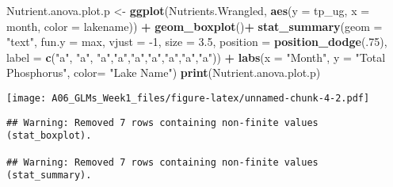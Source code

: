 \documentclass[]{article}
\newenvironment{Shaded}{\begin{snugshade}}{\end{snugshade}}
\newcommand{\CommentTok}[1]{\textcolor[rgb]{0.56,0.35,0.01}{\textit{#1}}}
\newcommand{\DataTypeTok}[1]{\textcolor[rgb]{0.13,0.29,0.53}{#1}}
\newcommand{\DecValTok}[1]{\textcolor[rgb]{0.00,0.00,0.81}{#1}}
\newcommand{\FloatTok}[1]{\textcolor[rgb]{0.00,0.00,0.81}{#1}}
\newcommand{\KeywordTok}[1]{\textcolor[rgb]{0.13,0.29,0.53}{\textbf{#1}}}
\newcommand{\NormalTok}[1]{#1}
\newcommand{\OperatorTok}[1]{\textcolor[rgb]{0.81,0.36,0.00}{\textbf{#1}}}
\newcommand{\StringTok}[1]{\textcolor[rgb]{0.31,0.60,0.02}{#1}}
\begin{document}
\begin{Shaded}
\begin{Highlighting}[]
\NormalTok{Nutrient.anova.plot.p <-}\StringTok{ }\KeywordTok{ggplot}\NormalTok{(Nutrients.Wrangled, }\KeywordTok{aes}\NormalTok{(}\DataTypeTok{y =}\NormalTok{ tp_ug, }\DataTypeTok{x =}\NormalTok{ month, }\DataTypeTok{color =}\NormalTok{ lakename)) }\OperatorTok{+}
\StringTok{  }\KeywordTok{geom_boxplot}\NormalTok{()}\OperatorTok{+}
\StringTok{  }\KeywordTok{stat_summary}\NormalTok{(}\DataTypeTok{geom =} \StringTok{"text"}\NormalTok{, }\DataTypeTok{fun.y =}\NormalTok{ max, }\DataTypeTok{vjust =} \DecValTok{-1}\NormalTok{, }\DataTypeTok{size =} \FloatTok{3.5}\NormalTok{, }
               \DataTypeTok{position =} \KeywordTok{position_dodge}\NormalTok{(.}\DecValTok{75}\NormalTok{),}
               \DataTypeTok{label =} \KeywordTok{c}\NormalTok{(}\StringTok{"a"}\NormalTok{, }\StringTok{"a"}\NormalTok{, }\StringTok{"a"}\NormalTok{,}\StringTok{"a"}\NormalTok{,}\StringTok{"a"}\NormalTok{,}\StringTok{"a"}\NormalTok{,}\StringTok{"a"}\NormalTok{,}\StringTok{"a"}\NormalTok{,}\StringTok{"a"}\NormalTok{)) }\OperatorTok{+}
\StringTok{  }\KeywordTok{labs}\NormalTok{(}\DataTypeTok{x =} \StringTok{"Month"}\NormalTok{, }\DataTypeTok{y =} \StringTok{"Total Phosphorus"}\NormalTok{, }\DataTypeTok{color=} \StringTok{"Lake Name"}\NormalTok{) }
\KeywordTok{print}\NormalTok{(Nutrient.anova.plot.p)}
\end{Highlighting}
\end{Shaded}

\texttt{[image: A06\_GLMs\_Week1\_files/figure-latex/unnamed-chunk-4-2.pdf]}

\begin{Shaded}
\end{Shaded}

\begin{verbatim}
## Warning: Removed 7 rows containing non-finite values (stat_boxplot).

## Warning: Removed 7 rows containing non-finite values (stat_summary).
\end{verbatim}
\end{document}
